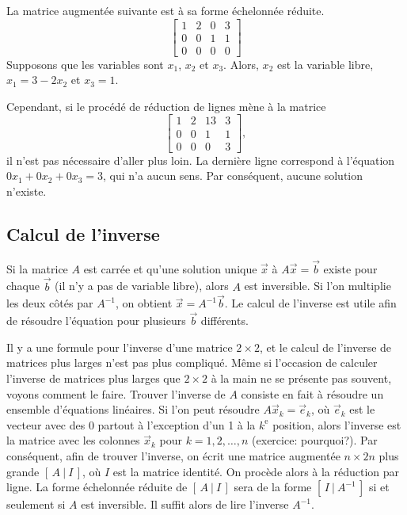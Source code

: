 \begin{example}
La matrice augmentée suivante est à sa forme échelonnée réduite.
\begin{equation*}
\left[
\begin{array}{ccc|c}
1 & 2 & 0 & 3 \\
0 & 0 & 1 & 1 \\
0 & 0 & 0 & 0
\end{array}
\right]
\end{equation*}
Supposons que les variables sont $x_1$, $x_2$ et $x_3$. Alors, $x_2$ est la variable libre, $x_1 = 3 - 2x_2$ et $x_3 = 1$.

\medskip

Cependant, si le procédé de réduction de lignes mène à la matrice
\begin{equation*}
\left[
\begin{array}{ccc|c}
1 & 2 & 13 & 3 \\
0 & 0 & 1 & 1 \\
0 & 0 & 0 & 3
\end{array}
\right]
,
\end{equation*}
il n'est pas nécessaire d'aller plus loin. La dernière ligne correspond à l'équation $0 x_1 + 0 x_2 + 0 x_3 = 3$, qui n'a aucun sens. Par conséquent, aucune solution n'existe.
\end{example}

\subsection{Calcul de l'inverse}

Si la matrice $A$ est carrée et qu'une solution unique
$\vec{x}$ à $A \vec{x} = \vec{b}$ existe pour chaque $\vec{b}$ (il n'y a pas de variable libre), alors $A$ est inversible.
Si l'on multiplie les deux côtés par $A^{-1}$, on obtient $\vec{x} =
A^{-1} \vec{b}$. Le calcul de l'inverse est utile afin de résoudre l'équation pour plusieurs $\vec{b}$ différents.

Il y a une formule pour l'inverse d'une matrice $2 \times 2$, et le calcul de l'inverse de matrices plus larges n'est pas plus compliqué. Même si l'occasion de calculer l'inverse de matrices plus larges que $2 \times 2$ à la main ne se présente pas souvent, voyons comment le faire. Trouver l'inverse de $A$ consiste en fait à résoudre un ensemble d'équations linéaires. Si l'on peut résoudre $A \vec{x}_k = \vec{e}_k$, où $\vec{e}_k$ est le vecteur avec des 0 partout à l'exception d'un 1 à la $k^{\text{e}}$ position, alors l'inverse est la matrice avec les colonnes $\vec{x}_k$ pour $k=1,2,\ldots,n$
(exercice: pourquoi?). Par conséquent, afin de trouver l'inverse, on écrit une matrice augmentée $n
\times 2n$ plus grande $[ \,A ~|~ I\, ]$, où $I$ est la matrice identité. On procède alors à la réduction par ligne. La forme échelonnée réduite de $[ \,A ~|~ I\, ]$ 
sera de la forme $[ \,I ~|~ A^{-1}\, ]$ si et seulement si
$A$ est inversible. Il suffit alors de lire l'inverse $A^{-1}$.


